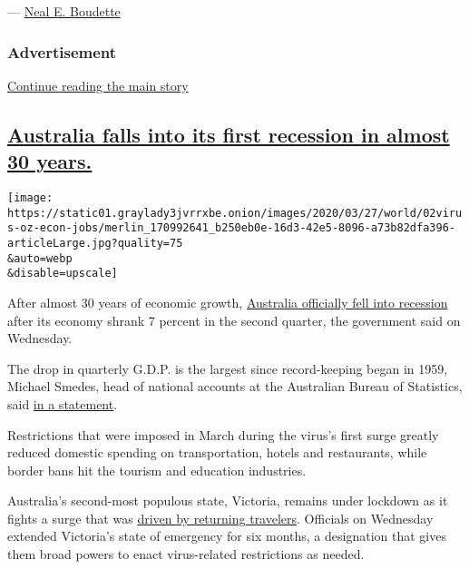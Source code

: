 --- \href{https://www.nytimes3xbfgragh.onion/by/neal-e-boudette}{Neal E.
Boudette}

\hypertarget{advertisement-1}{%
\subsubsection{Advertisement}\label{advertisement-1}}

\protect\hyperlink{after-dfp-ad-mid2}{Continue reading the main story}

\hypertarget{australia-falls-into-its-first-recession-in-almost-30-years}{%
\subsection{\texorpdfstring{\protect\hyperlink{australia-falls-into-its-first-recession-in-almost-30-years}{Australia
falls into its first recession in almost 30
years.}}{Australia falls into its first recession in almost 30 years.}}\label{australia-falls-into-its-first-recession-in-almost-30-years}}

\texttt{[image: https://static01.graylady3jvrrxbe.onion/images/2020/03/27/world/02virus-oz-econ-jobs/merlin\_170992641\_b250eb0e-16d3-42e5-8096-a73b82dfa396-articleLarge.jpg?quality=75\\\&auto=webp\\\&disable=upscale]}

After almost 30 years of economic growth,
\href{https://www.nytimes3xbfgragh.onion/2020/09/02/business/australia-recession.html}{Australia
officially fell into recession} after its economy shrank 7 percent in
the second quarter, the government said on Wednesday.

The drop in quarterly G.D.P. is the largest since record-keeping began
in 1959, Michael Smedes, head of national accounts at the Australian
Bureau of Statistics, said
\href{https://www.abs.gov.au/ausstats/abs\%40.nsf/mediareleasesbyCatalogue/C9973AC780DDFD3FCA257F690011045C?OpenDocument}{in
a statement}.

Restrictions that were imposed in March during the virus's first surge
greatly reduced domestic spending on transportation, hotels and
restaurants, while border bans hit the tourism and education industries.

Australia's second-most populous state, Victoria, remains under lockdown
as it fights a surge that was
\href{https://www.nytimes3xbfgragh.onion/2020/08/04/world/australia/coronavirus-melbourne-lockdown.html}{driven
by returning travelers}. Officials on Wednesday extended Victoria's
state of emergency for six months, a designation that gives them broad
powers to enact virus-related restrictions as needed.

